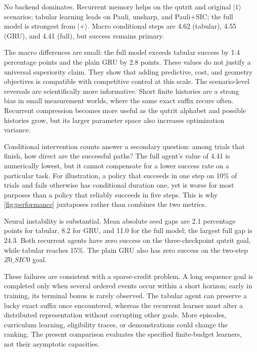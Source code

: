 \documentclass[11pt]{article}
\begin{document}
No backend dominates. Recurrent memory helps on the qutrit and original
$|1\rangle$ scenarios; tabular learning leads on Pauli, unsharp, and Pauli+SIC;
the full model is strongest from $|+\rangle$. Macro conditional steps are 4.62
(tabular), 4.55 (GRU), and 4.41 (full), but success remains primary.

The macro differences are small: the full model exceeds tabular success by
1.4 percentage points and the plain GRU by 2.8 points. These values do not
justify a universal superiority claim. They show that adding predictive,
cost, and geometry objectives is compatible with competitive control at this
scale. The scenario-level reversals are scientifically more informative.
Short finite histories are a strong bias in small measurement worlds, where
the same exact suffix recurs often. Recurrent compression becomes more useful
as the qutrit alphabet and possible histories grow, but its larger parameter
space also increases optimization variance.

Conditional intervention counts answer a secondary question: among trials
that finish, how direct are the successful paths? The full agent's value of
4.41 is numerically lowest, but it cannot compensate for a lower success rate
on a particular task. For illustration, a policy that succeeds in one step on
10\% of trials and fails otherwise has conditional duration one, yet is worse
for most purposes than a policy that reliably succeeds in five steps. This is
why \cref{fig:performance} juxtaposes rather than combines the two metrics.

Neural instability is substantial. Mean absolute seed gaps are 2.1 percentage
points for tabular, 8.2 for GRU, and 11.0 for the full model; the largest full
gap is 24.3. Both recurrent agents have zero success on the three-checkpoint
qutrit goal, while tabular reaches 15\%. The plain GRU also has zero success on
the two-step $Z0\_SIC0$ goal.

These failures are consistent with a sparse-credit problem. A long sequence
goal is completed only when several ordered events occur within a short
horizon; early in training, its terminal bonus is rarely observed. The
tabular agent can preserve a lucky exact suffix once encountered, whereas the
recurrent learner must alter a distributed representation without corrupting
other goals. More episodes, curriculum learning, eligibility traces, or
demonstrations could change the ranking. The present comparison evaluates the
specified finite-budget learners, not their asymptotic capacities.
\end{document}

